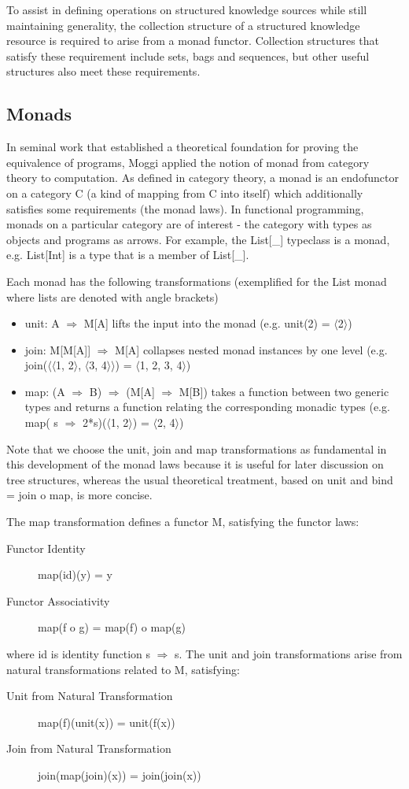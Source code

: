 \documentclass[runningheads]{llncs}
\begin{document}
To assist in defining operations on structured knowledge sources while still maintaining generality, the collection structure of a structured knowledge resource is required to arise from a monad functor. Collection structures that satisfy these requirement include sets, bags and sequences, but other useful structures also meet these requirements.

\subsection{Monads}
In seminal work that established a theoretical foundation for proving the equivalence of programs, Moggi\cite{moggi_notions_1991} applied the notion of monad from category theory\cite{MacLane1998} to computation.
As defined in category theory, a monad  is an endofunctor on a category C (a kind of mapping from C into itself) which additionally satisfies some requirements (the monad laws).
In functional programming, monads on a particular category are of interest - the category with types as objects and programs as arrows.
For example, the List[\_] typeclass is a monad, e.g. List[Int] is a type that is a member of List[\_].

Each monad has the following transformations (exemplified for the List monad where lists are denoted with angle brackets)
\begin{itemize}
\item unit: A $\Rightarrow$ M[A] lifts the input into the monad (e.g. unit(2) = $\langle$2$\rangle$)
\item join: M[M[A]] $\Rightarrow$ M[A] collapses nested monad instances by one level (e.g. join($\langle$$\langle$1, 2$\rangle$, $\langle$3, 4$\rangle$$\rangle$) = $\langle$1, 2, 3, 4$\rangle$)
\item map: (A $\Rightarrow$ B) $\Rightarrow$ (M[A] $\Rightarrow$ M[B]) takes a function between two generic types and returns a function relating the corresponding monadic types (e.g. map( s $\Rightarrow$ 2*s)($\langle$1, 2$\rangle$) = $\langle$2, 4$\rangle$)
\end{itemize}
Note that we choose the unit, join and map transformations\cite{Wadler1992} as fundamental in this development of the monad laws because it is useful for later discussion on tree structures, whereas the usual theoretical treatment, based on unit and bind = join o map, is more concise.

The map transformation defines a functor M, satisfying the functor laws:
\begin{description}
\item[Functor Identity] map(id)(y) = y
\item[Functor Associativity] map(f o g) = map(f) o map(g)
\end{description}
where id is identity function s $\Rightarrow$ s.
The unit and join transformations arise from natural transformations related to M, satisfying:
\begin{description}
\item[Unit from Natural Transformation] map(f)(unit(x)) = unit(f(x))
\item[Join from Natural Transformation] join(map(join)(x)) = join(join(x))
\end{description}
\end{document}
